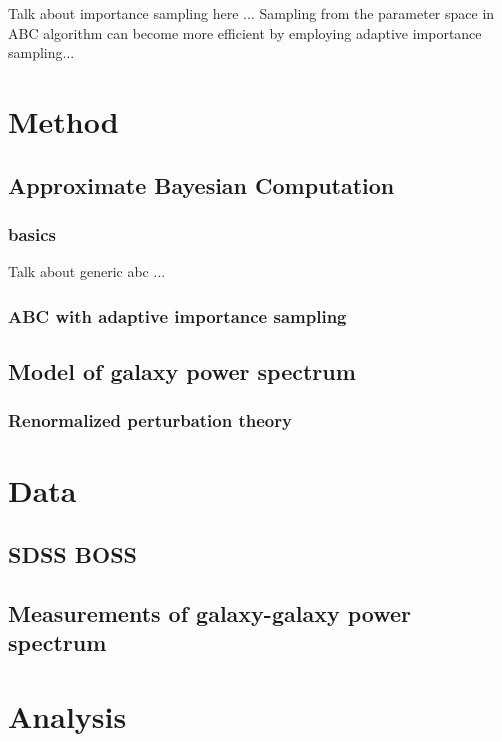 \documentclass[12pt, preprint]{aastex}
\begin{document}
Talk about importance sampling here ...
Sampling from the parameter space in ABC algorithm can become more efficient by 
employing adaptive importance sampling... 

\section{Method}

\subsection{Approximate Bayesian Computation}

\subsubsection{basics}

Talk about generic abc ...

\subsubsection{ABC with adaptive importance sampling}



\subsection{Model of galaxy power spectrum}


\subsubsection{Renormalized perturbation theory}

\section{Data}

\subsection{SDSS BOSS}

\subsection{Measurements of galaxy-galaxy power spectrum}

\section{Analysis}
\end{document}
